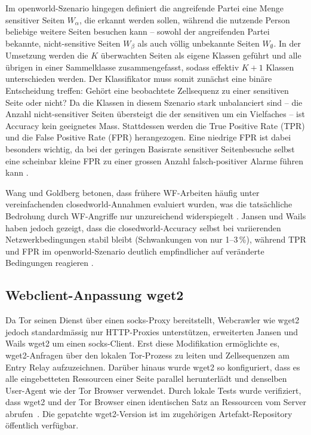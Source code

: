 Im \gls{openworld}-Szenario hingegen definiert die angreifende Partei
eine Menge sensitiver Seiten $W_\alpha$, die erkannt werden sollen,
während die nutzende Person beliebige weitere Seiten besuchen kann --
sowohl der angreifenden Partei bekannte, nicht-sensitive Seiten $W_\beta$ als
auch völlig unbekannte Seiten $W_\emptyset$.
In der Umsetzung werden die $K$ überwachten Seiten als eigene Klassen geführt und alle übrigen in einer Sammelklasse zusammengefasst, sodass effektiv $K+1$ Klassen unterschieden werden.
Der Klassifikator
muss somit zunächst eine binäre Entscheidung treffen: Gehört eine 
beobachtete Zellsequenz zu einer sensitiven Seite oder nicht? Da 
die Klassen in diesem Szenario stark unbalanciert sind -- die 
Anzahl nicht-sensitiver Seiten übersteigt die der sensitiven um 
ein Vielfaches -- ist Accuracy kein geeignetes Mass. Stattdessen 
werden die True Positive Rate (TPR) und die False Positive Rate
(FPR) herangezogen. Eine niedrige FPR
ist dabei besonders wichtig, da bei der geringen Basisrate 
sensitiver Seitenbesuche selbst eine scheinbar kleine FPR zu einer 
grossen Anzahl falsch-positiver Alarme führen kann
\cite{wang2016realistically}.

Wang und Goldberg betonen, dass frühere WF-Arbeiten häufig unter
vereinfachenden \gls{closedworld}-Annahmen evaluiert wurden, was die
tatsächliche Bedrohung durch WF-Angriffe nur unzureichend
widerspiegelt \cite{wang2016realistically}. Jansen und Wails haben
jedoch gezeigt, dass die \gls{closedworld}-Accuracy selbst bei
variierenden Netzwerkbedingungen stabil bleibt (Schwankungen von
nur 1--3\,\%), während TPR und FPR im \gls{openworld}-Szenario
deutlich empfindlicher auf veränderte Bedingungen reagieren
\cite{jansen2023data}.



\subsection{Webclient-Anpassung wget2}
\label{sec:standtechnik_wget2}

Da Tor seinen Dienst über einen \gls{socks}-Proxy bereitstellt, Webcrawler wie wget2 jedoch standardmässig nur HTTP-Proxies unterstützen, erweiterten Jansen und Wails wget2 um einen \gls{socks}-Client.
Erst diese Modifikation ermöglichte es, wget2-Anfragen über den lokalen Tor-Prozess zu leiten und Zellsequenzen am Entry Relay aufzuzeichnen.
Darüber hinaus wurde wget2 so konfiguriert, dass es alle eingebetteten Ressourcen einer Seite parallel herunterlädt und denselben User-Agent wie der Tor Browser verwendet.
Durch lokale Tests wurde verifiziert, dass wget2 und der Tor Browser einen identischen Satz an Ressourcen vom Server abrufen~\cite{jansen2023data}.
Die gepatchte wget2-Version ist im zugehörigen Artefakt-Repository öffentlich verfügbar.


